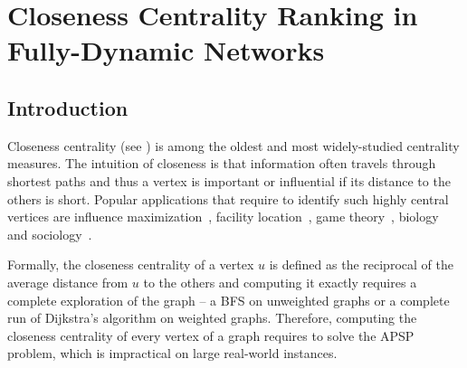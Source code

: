 \chapter{Closeness Centrality Ranking in Fully-Dynamic Networks}
\label{ch:dyn-topk}

\section{Introduction}
\label{sec:dyn-topk:intro}
%
Closeness centrality (see ) is among the
oldest and most widely-studied centrality measures. The intuition of closeness is
that information often travels through shortest paths and thus a vertex is
important or influential if its distance to the others is short.
Popular applications that require to identify such highly central vertices are
influence
maximization~\cite{DBLP:journals/toc/KempeKT15,DBLP:journals/isci/ZhaoWLTG17},
facility
location~\cite{DBLP:journals/pe/GkantsidisMS06,DBLP:conf/icde/LiLCCDZ15},
game theory~\cite{holme2006dynamics}, biology~\cite{DBLP:journals/bmcsb/AshtianiSRHWMJ18}
and sociology~\cite{bavelas1950communication}.

Formally, the closeness centrality of a vertex $u$ is defined as the reciprocal of the
average distance from $u$ to the others and computing it exactly requires
a complete exploration of the graph -- \ie a BFS on unweighted graphs or a complete run
of Dijkstra's algorithm on weighted graphs.
Therefore, computing the closeness centrality of every vertex of a graph
requires to solve the APSP problem, which is impractical on large
real-world instances.

